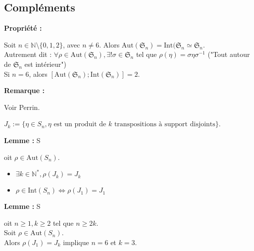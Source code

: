 \documentclass{report}
\newenvironment{prop}{\begin{tcolorbox}[colframe= white]
    \textbf{Propriété :}
     \par}
    {\end{tcolorbox}}
\newenvironment{lemme}[2][white]{\begin{tcolorbox}[colframe= #1]
    \textbf{Lemme :} #2  \par}
    {\end{tcolorbox}}
\newcommand{\remarque}{
    \noindent\textbf{Remarque :} \par
}
\newcommand{\N}{\mathbb{N}}
\begin{document}
\subsection{Compléments}

\begin{prop}
    Soit $n\in\N\setminus\{0,1,2\}$, avec $n \neq 6$. Alors $\mathrm{Aut}(\mathfrak{S}_n) = \mathrm{Int}(\mathfrak{S}_n \simeq \mathfrak{S}_n$.\\
    Autrement dit : $\forall \rho\in\mathrm{Aut}(\mathfrak{S}_n),\exists ! \sigma\in\mathfrak{S}_n$ tel que $\rho(\eta) = \sigma\eta\sigma^{-1}$ ("Tout autour de $\mathfrak{S}_n$ est intérieur")\\
    Si $n = 6$, alors $[\mathrm{Aut}(\mathfrak{S}_n);\mathrm{Int}(\mathfrak{S}_n)] = 2$.
\end{prop}

\remarque
Voir Perrin.

$J_k := \{\eta \in S_n, \eta \textrm{ est un produit de } k \textrm{ transpositions à support disjoints}\}$.

\begin{lemme}
    Soit $\rho\in\mathrm{Aut}(S_n)$.
    \begin{itemize}
        \item $\exists k\in\N^*, \rho(J_k) =J_k$
        \item $\rho\in\mathrm{Int}(S_n) \iff \rho(J_1) = J_1$
    \end{itemize}
\end{lemme}

\begin{lemme}
    Soit $n \geq 1, k\geq 2$ tel que $n \geq 2k$.\\
    Soit $\rho \in\mathrm{Aut}(S_n)$.\\
    Alors $\rho(J_1) = J_k$ implique $n = 6$ et $k = 3$.
\end{lemme}
\end{document}
